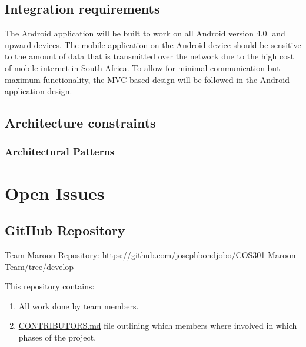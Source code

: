 \documentclass[a4paper,10pt]{article}
\begin{document}
\subsection{Integration requirements}
The Android application will be built to work on all Android version 4.0.  and upward devices. The mobile application on the Android device should be sensitive to the amount of data that is transmitted over the network due to the high cost of mobile internet in South Africa. To allow for minimal communication but maximum functionality, the MVC based design will be followed in the Android application design. 
\subsection{Architecture constraints}

\subsubsection{Architectural Patterns}

\clearpage
\section{Open Issues}
\subsection {GitHub Repository}
Team Maroon Repository: \url{https://github.com/josephbondjobo/COS301-Maroon-Team/tree/develop}

This repository contains:
\begin{enumerate}
\item All work done by team members.
\item \href{https://github.com/josephbondjobo/COS301-Maroon-Team/blob/develop/Intro/Contributors.md}{CONTRIBUTORS.md} file outlining which members where involved in which phases of the project.
\end{enumerate}



\newpage
\clearpage
{}
\end{document}

